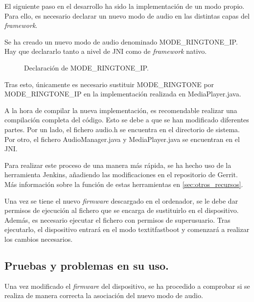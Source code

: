 El siguiente paso en el desarrollo ha sido la implementación de un modo propio. Para ello, es necesario declarar un nuevo modo de audio en las distintas capas del \textit{framework}.

Se ha creado un nuevo modo de audio denominado MODE\_RINGTONE\_IP. Hay que declararlo tanto a nivel de \gls{JNI} como de \textit{framework} nativo.

\begin{figure}[H]
	\centering
	\caption{Declaración de MODE\_RINGTONE\_IP.} \label{fig:mode_ringtone_ip}
\end{figure}

Tras esto, únicamente es necesario sustituir MODE\_RINGTONE por \\ MODE\_RINGTONE\_IP en la implementación realizada en MediaPlayer.java.

A la hora de compilar la nueva implementación, es recomendable realizar una compilación completa del código. Esto se debe a que se han modificado diferentes partes. Por un lado, el fichero audio.h se encuentra en el directorio de sistema. Por otro, el fichero AudioManager.java y MediaPlayer.java se encuentran en el \gls{JNI}.

Para realizar este proceso de una manera más rápida, se ha hecho uso de la herramienta Jenkins, añadiendo las modificaciones en el repositorio de Gerrit. Más información sobre la función de estas herramientas en \ref{sec:otros_recursos}.

Una vez se tiene el nuevo \textit{firmware} descargado en el ordenador, se le debe dar permisos de ejecución al fichero que se encarga de sustituirlo en el dispositivo. Además, es necesario ejecutar el fichero con permisos de superusuario. Tras ejecutarlo, el dispositivo entrará en el modo textit{fastboot} y comenzará a realizar los cambios necesarios.
 
\subsection{Pruebas y problemas en su uso.} \label{sec:pruebas_nuevo_modo}
Una vez modificado el \textit{firmware} del dispositivo, se ha procedido a comprobar si se realiza de manera correcta la asociación del nuevo modo de audio.

